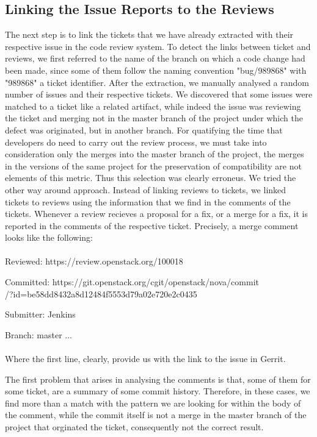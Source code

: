 \documentclass[ifip]{svmult}
\begin{document}
\subsection{Linking the Issue Reports to the Reviews}
\label{sec:4.2}

The next step is to link the tickets that we have already extracted with their respective issue in the code review system.
To detect the links between ticket and reviews, we first referred to the name of the branch on which a code change had 
been made, since some of them follow the naming convention "bug/989868" with "989868" a ticket identifier.
After the extraction, we manually analysed a random number of issues and their respective tickets. We discovered 
that some issues were matched to a ticket like a related artifact, while indeed the issue was reviewing the ticket and merging 
not in the master branch of the project under which the defect was originated, but in another branch. 
For quatifying the time that developers do need to carry out the review process, we must take into consideration only the 
merges into the master branch of the project, the merges in the versions of the same project for the preservation of compatibility 
are not elements of this metric. Thus this selection was clearly erroneus.
We tried the other way around approach. Instead of linking reviews to tickets, we linked tickets to reviews using the information
that we find in the comments of the tickets. Whenever a review recieves a proposal for a fix, or a merge for a fix, it is reported in the 
comments of the respective ticket. 
Precisely, a merge comment looks like the following:  
\\
\\
Reviewed:  https://review.openstack.org/100018

Committed: https://git.openstack.org/cgit/openstack/nova/commit
\\
/?id=be58dd8432a8d12484f5553d79a02e720e2c0435

Submitter: Jenkins

Branch:    master ...
\\
\\
Where the first line, clearly, provide us with the link to the issue in Gerrit. 

The first problem that arises in analysing the comments is that, some of them for some ticket, are a summary of some commit history. 
Therefore, in these cases, we find more than a match with the pattern we are looking for within the body of 
the comment, while the commit itself is not a merge in the master branch of the project that orginated the ticket, 
consequently not the correct result. 
\end{document}
